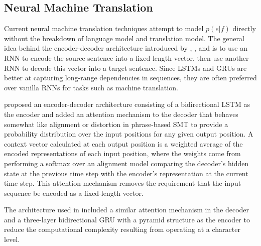 \subsection{Neural Machine Translation}
Current neural machine translation techniques attempt to model $p(e|f)$ directly without the breakdown of language model and translation model. The general idea behind the encoder-decoder architecture introduced by \citet{Sutskever2014SequenceNetworks}, \citet{Cho2014LearningTranslation}, and \citet{Bahdanau2014NeuralTranslate} is to use an RNN to encode the source sentence into a fixed-length vector, then use another RNN to decode this vector into a target sentence. Since LSTMs and GRUs are better at capturing long-range dependencies in sequences, they are often preferred over vanilla RNNs for tasks such as machine translation.

\citet{Bahdanau2014NeuralTranslate} proposed an encoder-decoder architecture consisting of a bidirectional LSTM as the encoder and added an attention mechanism to the decoder that behaves somewhat like alignment or distortion in phrase-based SMT to provide a probability distribution over the input positions for any given output position. A context vector calculated at each output position is a weighted average of the encoded representations of each input position, where the weights come from performing a softmax over an alignment model comparing the decoder's hidden state at the previous time step with the encoder's representation at the current time step.
This attention mechanism removes the requirement that the input sequence be encoded as a fixed-length vector.

The architecture used in \citet{Xie2016NeuralAttention} included a similar attention mechanism in the decoder and a three-layer bidirectional GRU with a pyramid structure as the encoder to reduce the computational complexity resulting from operating at a character level.


